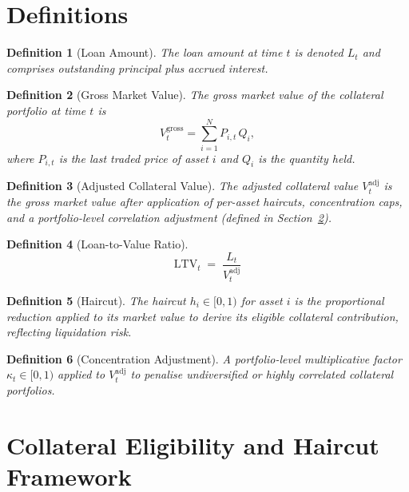\documentclass[12pt, a4paper]{article}
\newtheorem{definition}{Definition}[section]
\newcommand{\LTV}{\mathrm{LTV}}
\newcommand{\1}{\mathbbm{1}}
\begin{document}
\section{Definitions}
\label{sec:definitions}

\begin{definition}[Loan Amount]
The loan amount at time $t$ is denoted $L_t$ and comprises outstanding principal
plus accrued interest.
\end{definition}

\begin{definition}[Gross Market Value]
The gross market value of the collateral portfolio at time $t$ is
\[
V_t^{\mathrm{gross}} = \sum_{i=1}^{N} P_{i,t}\,Q_i,
\]
where $P_{i,t}$ is the last traded price of asset $i$ and $Q_i$ is the quantity held.
\end{definition}

\begin{definition}[Adjusted Collateral Value]
The adjusted collateral value $V_t^{\mathrm{adj}}$ is the gross market value
after application of per-asset haircuts, concentration caps, and a
portfolio-level correlation adjustment (defined in Section~\ref{sec:collateral}).
\end{definition}

\begin{definition}[Loan-to-Value Ratio]
\[
\LTV_t \;=\; \frac{L_t}{V_t^{\mathrm{adj}}}
\]
\end{definition}

\begin{definition}[Haircut]
The haircut $h_i \in [0,1)$ for asset $i$ is the proportional reduction applied to
its market value to derive its eligible collateral contribution, reflecting
liquidation risk.
\end{definition}

\begin{definition}[Concentration Adjustment]
A portfolio-level multiplicative factor $\kappa_t \in [0,1)$ applied to
$V_t^{\mathrm{adj}}$ to penalise undiversified or highly correlated collateral
portfolios.
\end{definition}

\section{Collateral Eligibility and Haircut Framework}
\label{sec:collateral}
\end{document}
